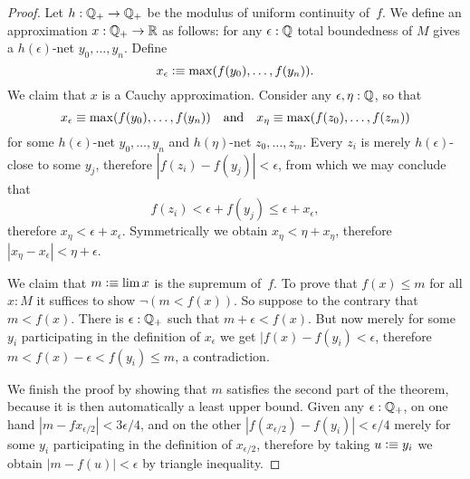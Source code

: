 \begin{proof}
  Let $h : \mathbb{Q}_{+} \to \mathbb{Q}_{+}$ be the modulus of uniform continuity of~$f$.
  We define an approximation $x : \mathbb{Q}_{+} \to \mathbb{R}$ as follows: for any $\epsilon : \mathbb{Q}$ total
  boundedness of $M$ gives a $h(\epsilon)$-net $y_0, \ldots, y_n$. Define
  \begin{equation*}
    x_\epsilon \vcentcolon\equiv \max (f(y_0), \ldots, f(y_n)).
  \end{equation*}
  We claim that $x$ is a Cauchy approximation. Consider any $\epsilon, \eta : \mathbb{Q}$, so that
  \begin{equation*}
    x_\epsilon \equiv \max (f(y_0), \ldots, f(y_n))
    \quad\text{and}\quad
    x_\eta \equiv \max (f(z_0), \ldots, f(z_m))
  \end{equation*}
  for some $h(\epsilon)$-net $y_0, \ldots, y_n$ and $h(\eta)$-net $z_0, \ldots, z_m$.
  Every $z_i$ is merely $h(\epsilon)$-close to some $y_j$, therefore $|f(z_i) - f(y_j)| <
  \epsilon$, from which we may conclude that
  \begin{equation*}
    f(z_i) < \epsilon + f(y_j) \leq \epsilon + x_\epsilon,
  \end{equation*}
  therefore $x_\eta < \epsilon + x_\epsilon$. Symmetrically we obtain $x_\eta < \eta +
  x_\eta$, therefore $|x_\eta - x_\epsilon| < \eta + \epsilon$.

  We claim that $m \vcentcolon\equiv \lim x$ is the supremum of~$f$. To prove that $f(x) \leq m$ for
  all $x : M$ it suffices to show $\lnot (m < f(x))$. So suppose to the contrary that $m <
  f(x)$. There is $\epsilon : \mathbb{Q}_{+}$ such that $m + \epsilon < f(x)$. But now merely for
  some $y_i$ participating in the definition of $x_\epsilon$ we get $|f(x) - f(y_i) <
  \epsilon$, therefore $m < f(x) - \epsilon < f(y_i) \leq m$, a contradiction.

  We finish the proof by showing that $m$ satisfies the second part of the theorem, because
  it is then automatically a least upper bound. Given any $\epsilon : \mathbb{Q}_{+}$, on one hand
  $|m - fx_{\epsilon/2}| < 3 \epsilon/4$, and on the other $|f(x_{\epsilon/2}) - f(y_i)| <
  \epsilon/4$ merely for some $y_i$ participating in the definition of $x_{\epsilon/2}$,
  therefore by taking $u \vcentcolon\equiv y_i$ we obtain $|m - f(u)| < \epsilon$ by triangle
  inequality.
\end{proof}

